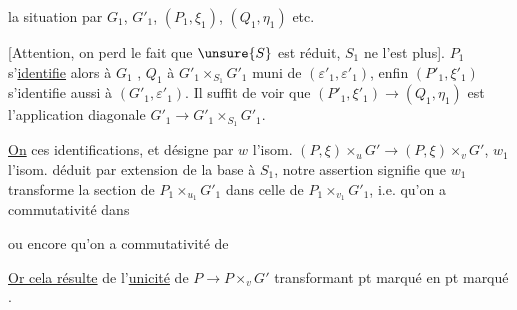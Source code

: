 la situation par $G_1$, $G'_1$, $(P_1,\xi_1)$, $(Q_1,\eta_1)$ etc.

[Attention, on perd le fait que $\unsure{S}$ est réduit, $S_1$ ne l'est plus].
$P_1$ s'\uline{identifie} alors à $G_1$
,
$Q_1$ à $G'_1\times_{S_1}G'_1$ muni de $(\varepsilon'_1,\varepsilon'_1)$,
 enfin $(P'_1,\xi'_1)$ s'identifie aussi à
$(G'_1,\varepsilon'_1)$.
Il suffit de voir que $(P'_1,\xi'_1)\to(Q_1,\eta_1)$ est
l'application diagonale $G'_1\to G'_1\times_{S_1}G'_1$.

\uline{On}  ces identifications, et désigne par $w$ l'isom.
$(P,\xi)\times_u G'\to(P,\xi)\times_v G'$,
$w_1$ l'isom. déduit par extension de la base à $S_1$,
notre assertion signifie que $w_1$ transforme la section
 de $P_1\times_{u_1}G'_1$ dans celle de
$P_1\times_{v_1}G'_1$, i.e. qu'on a commutativité dans


ou encore qu'on a commutativité de


\uline{Or cela résulte} de l'\uline{unicité} de $P\to P\times_vG'$
transformant  pt marqué en pt marqué .

